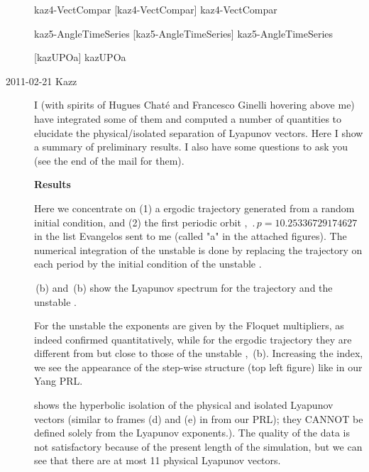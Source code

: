 \begin{description}
{kaz4-VectCompar}   %
{}   %
{    %
{\po}  [kaz4-VectCompar]
}
{kaz4-VectCompar}   %

{kaz5-AngleTimeSeries}   %
{}   %
{    %
{\po}  [kaz5-AngleTimeSeries]
}
{kaz5-AngleTimeSeries}   %

{}   %
{    %
{\po}  [kazUPOa]
}
{kazUPOa}   %

\item[2011-02-21 Kazz]
I (with spirits of Hugues Chat\'e and Francesco Ginelli hovering above me)
have integrated some of
them and computed a number of quantities to elucidate the
physical/isolated separation of Lyapunov vectors. Here I show a
summary of preliminary results. I also have some questions to ask you
(see the end of the mail for them).


\textbf{Results}

Here we concentrate on (1) a ergodic trajectory generated from a random
initial condition, and (2) the first periodic orbit ,
$\period{p}=10.25336729174627$ in the list
Evangelos sent to me (called "{\po}a" in the attached
figures). The numerical integration of the {unstable \po} is done by replacing the
trajectory on each period by the initial condition of the {unstable \po}.

\,(b)
and
\,(b)
show the Lyapunov spectrum for
the trajectory and the {unstable \po}.

For the {unstable \po} the exponents are
given by the Floquet multipliers, as indeed confirmed quantitatively,
while for the ergodic trajectory they are different from but close to
those of the {unstable \po}, \,(b).
Increasing the index, we
see the appearance of the step-wise structure (top left figure) like in
our Yang \etal{} PRL.

 shows the hyperbolic isolation of the physical and
isolated Lyapunov vectors (similar to frames (d) and (e) in 
from our PRL); they
CANNOT be defined solely from the Lyapunov exponents.). The quality of
the data is not satisfactory because of the present length of the
simulation, but we can see that there are at most 11 physical Lyapunov vectors.



\end{description}
